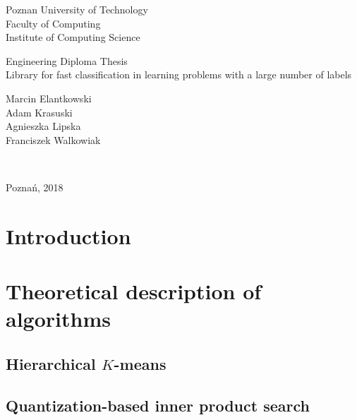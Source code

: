 \documentclass[12pt]{article}
\begin{document}
\thispagestyle{empty}
\begin{center}
	\begin{Large}
	Poznan University of Technology\\
	Faculty of Computing\\
	Institute of Computing Science\\
	\end{Large}
	\vspace*{\fill}
		\begin{Large}
			Engineering Diploma Thesis\\
			\vspace{2ex}
			Library for fast classification in learning problems with a large number of labels\\
			\vspace{2ex}
		\end{Large}
		\begin{large}
			\vspace{2ex}
			Marcin Elantkowski\\
			Adam Krasuski\\
			Agnieszka Lipska\\
			Franciszek Walkowiak\\
		\end{large}
	\vspace*{\fill}
\end{center}
\begin{large}
	\\
\end{large}
\begin{center}
	\vspace{5ex}
	Poznań, 2018
\end{center}
\restoregeometry
\newpage
\tableofcontents
\newpage
\section{Introduction}
	
\section{Theoretical description of algorithms}
	
	\subsection{Hierarchical $K$-means}
	
	\subsection{Quantization-based inner product search}
	
\end{document}
